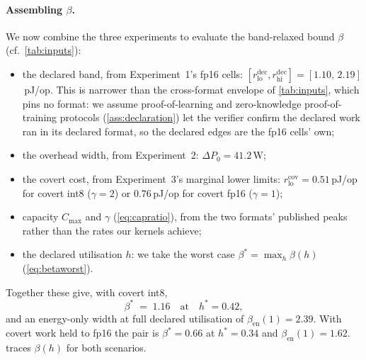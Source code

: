 \documentclass{article}
\theoremstyle{plain}
\theoremstyle{definition}
\theoremstyle{remark}
\begin{document}
\paragraph{Assembling $\beta$.}
We now combine the three experiments to evaluate the band-relaxed bound $\beta$
(cf.\ \cref{tab:inputs}):
\begin{itemize}
	\item the declared band, from Experiment~1's fp16 cells:
	$[r_{\mathrm{lo}}^{\mathrm{dec}}, r_{\mathrm{hi}}^{\mathrm{dec}}]
	= [1.10,\,2.19]$\,pJ/op. This is narrower than the cross-format
	envelope of \cref{tab:inputs}, which pins no format: we assume
	proof-of-learning and zero-knowledge proof-of-training protocols
	(\cref{ass:declaration}) let the verifier confirm the declared work
	ran in its declared format, so the declared edges are the fp16 cells'
	own;
	\item the overhead width, from Experiment~2:
	$\Delta P_0 = 41.2$\,W;
	\item the covert cost, from Experiment~3's marginal lower limits:
	$r_{\mathrm{lo}}^{\mathrm{cov}} = 0.51$\,pJ/op for covert int8
	($\gamma = 2$) or $0.76$\,pJ/op for covert fp16 ($\gamma = 1$);
	\item capacity $C_{\max}$ and $\gamma$ (\cref{eq:capratio}), from the
	two formats' published peaks rather than the rates our kernels
	achieve;
	\item the declared utilisation $h$: we take the worst case
	$\beta^{*} = \max_h \beta(h)$ (\cref{eq:betaworst}).
\end{itemize}
Together these give, with covert int8,
\begin{equation}
	\beta^{*} \;=\; 1.16
	\quad\text{at}\quad h^{*} = 0.42,
	\label{eq:betafloormeasured}
\end{equation}
and an energy-only width at full declared utilisation of
$\beta_{\mathrm{en}}(1) = 2.39$. With covert work held to fp16 the pair
is $\beta^{*} = 0.66$ at $h^{*} = 0.34$ and
$\beta_{\mathrm{en}}(1) = 1.62$.  traces $\beta(h)$
for both scenarios.
\end{document}
